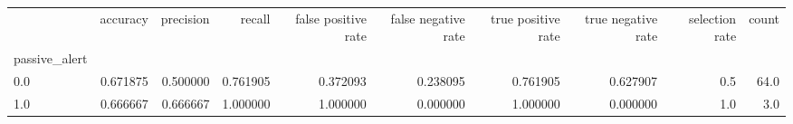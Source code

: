 \begin{tabular}{lrrrrrrrrr}
\toprule
{} &  accuracy &  precision &    recall &  false positive rate &  false negative rate &  true positive rate &  true negative rate &  selection rate &  count \\
passive\_alert &           &            &           &                      &                      &                     &                     &                 &        \\
\midrule
0.0           &  0.671875 &   0.500000 &  0.761905 &             0.372093 &             0.238095 &            0.761905 &            0.627907 &             0.5 &   64.0 \\
1.0           &  0.666667 &   0.666667 &  1.000000 &             1.000000 &             0.000000 &            1.000000 &            0.000000 &             1.0 &    3.0 \\
\bottomrule
\end{tabular}
